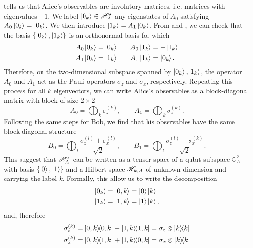  tells us that Alice's observables are involutory matrices, i.e. matrices with eigenvalues $\pm 1$.
We label $\ket{0_k} \in \mathscr{H}_A^\star$ any eigenstates of $A_0$ satisfying $A_0 \ket{0_k} = \ket{0_k} $.
We then introduce $\ket{1_k} = A_1 \ket{0_k}$.
From  and , we can check that the basis $\{\ket{0_k},\ket{1_k}\}$ is an orthonormal basis for which
\begin{equation}
	\begin{split}
		A_0 \ket{0_k} = \ket{0_k} \qquad & A_0 \ket{1_k} = -\ket{1_k} \\
		A_1 \ket{0_k} = \ket{1_k} \qquad & A_1 \ket{1_k} = \ket{0_k}.
	\end{split}
\end{equation}
Therefore, on the two-dimensional subspace spanned by $\ket{0_k},\ket{1_k}$, the operator $A_0$ and $A_1$ act as the Pauli operators $\sigma_z$ and $\sigma_x$, respectively. 
Repeating this process for all $k$ eigenvectors, we can write Alice's observables as a block-diagonal matrix with block of size $2 \times 2$
\begin{equation}
	A_0 = \bigoplus_k \sigma_z^{(k)}, \qquad A_1 = \bigoplus_k \sigma_x^{(k)}.
	\label{eq:}
\end{equation}
Following the same steps for Bob, we find that his observables have the same block diagonal structure
\begin{equation}
	B_0 = \bigoplus_l \frac{\sigma_z^{(l)}+\sigma_x^{(l)}}{\sqrt{2}}, \qquad B_1 = \bigoplus_l \frac{\sigma_z^{(l)}-\sigma_x^{(k)}}{\sqrt{2}}.
\end{equation}
This suggest that $\mathscr{H}_A^\star$ can be written as a tensor space of a qubit subspace $\mathds{C}_A^2$ with basis $\{\ket{0},\ket{1}\}$ and a Hilbert space $\mathscr{H}_{k,A}$ of unknown dimension and carrying the label $k$.
Formally, this allow us to write the decomposition
\begin{equation}
	\begin{split}
		\ket{0_k} &= \ket{0,k} = \ket{0}\ket{k} \\
		\ket{1_k} &= \ket{1,k} = \ket{1}\ket{k},
	\end{split}	
\end{equation}
and, therefore
\begin{equation}
	\begin{split}
		\sigma_z^{(k)} &= \ketbra{0,k}-\ketbra{1,k} = \sigma_z \otimes \ketbra{k} \\
		\sigma_x^{(k)} &= \ketbra{0,k}{1,k}+\ketbra{1,k}{0,k} = \sigma_x \otimes \ketbra{k}
	\end{split}
\end{equation}
